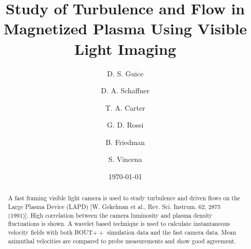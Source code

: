 \documentclass[%
 reprint,
 amsmath,amssymb,
 aps,
]{revtex4-1}
\begin{document}

\title{Study of Turbulence and Flow in Magnetized Plasma Using Visible Light Imaging}

\author{D. S. Guice}
\author{D. A. Schaffner}
\author{T. A. Carter}
\author{G. D. Rossi}
\author{B. Friedman}
\author{S. Vincena}
 
%


\date{\today}%
            

\begin{abstract}
A fast framing visible light camera is used to study turbulence and driven flows on the Large Plasma Device (LAPD) [W. Gekelman et al., Rev. Sci. Instrum. 62, 2875 (1991)]. High correlation between the camera luminosity and plasma density fluctuations is shown. A wavelet based technique is used to calculate instantaneous velocity fields with both BOUT$++$ simulation data and the fast camera data. Mean azimuthal velocities are compared to probe measurements and show good agreement.
\end{abstract}

\maketitle

\end{document}
